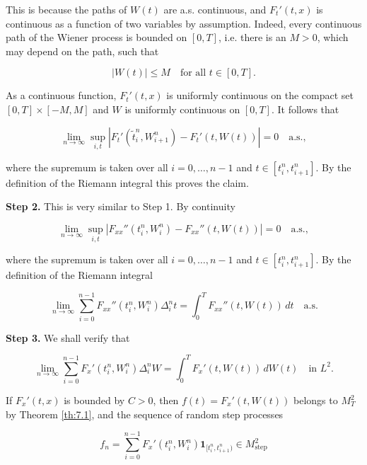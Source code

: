 \begin{Proof}
This is because the paths of $W(t)$ are a.s. continuous, and $F_t'(t, x)$ is continuous as a function of two variables by assumption. Indeed, every continuous path of the Wiener process is bounded on $[0, T]$, i.e. there is an $M > 0$, which may depend on the path, such that

\begin{equation}
|W(t)| \leq M \quad \text{for all } t \in [0, T].
\end{equation}

As a continuous function, $F_t'(t, x)$ is uniformly continuous on the compact set $[0, T] \times [-M, M]$ and $W$ is uniformly continuous on $[0, T]$. It follows that

\begin{equation}
\lim_{n \to \infty} \sup_{i, t} \left|F_t'(\tilde{t}_i^n, W_{i+1}^n) - F_t'(t, W(t))\right| = 0 \quad \text{a.s.},
\end{equation}

where the supremum is taken over all $i = 0, \ldots, n-1$ and $t \in [t_i^n, t_{i+1}^n]$. By the definition of the Riemann integral this proves the claim.

\medskip\noindent\textbf{Step 2.} This is very similar to Step 1. By continuity

\begin{equation}
\lim_{n \to \infty} \sup_{i, t} |F_{xx}''(t_i^n, W_i^n) - F_{xx}''(t, W(t))| = 0 \quad \text{a.s.},
\end{equation}

where the supremum is taken over all $i = 0, \ldots, n-1$ and $t \in [t_i^n, t_{i+1}^n]$. By the definition of the Riemann integral

\begin{equation}
\lim_{n \to \infty} \sum_{i=0}^{n-1} F_{xx}''(t_i^n, W_i^n) \Delta_i^n t = \int_0^T F_{xx}''(t, W(t)) \, dt \quad \text{a.s.}
\end{equation}

\medskip\noindent\textbf{Step 3.} We shall verify that

\begin{equation}
\lim_{n \to \infty} \sum_{i=0}^{n-1} F_x'(t_i^n, W_i^n) \Delta_i^n W = \int_0^T F_x'(t, W(t)) \, dW(t) \quad \text{in } L^2.
\end{equation}

If $F_x'(t, x)$ is bounded by $C > 0$, then $f(t) = F_x'(t, W(t))$ belongs to $M_T^2$ by Theorem \ref{th:7.1}, and the sequence of random step processes

\begin{equation}
f_n = \sum_{i=0}^{n-1} F_x'(t_i^n, W_i^n) \mathbf{1}_{[t_i^n, t_{i+1}^n)} \in M_{\mathrm{step}}^2
\end{equation}


\end{Proof}
